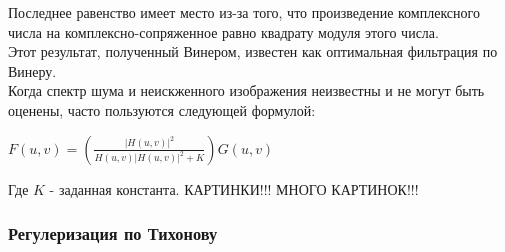 \documentclass{article}
\begin{document}
	Последнее равенство имеет место из-за того, что произведение комплексного числа на комплексно-сопряженное равно квадрату модуля этого числа.\\
	Этот результат, полученный Винером, известен как оптимальная фильтрация по Винеру.\\
	Когда спектр шума и неискженного изображения неизвестны и не могут быть оценены, часто пользуются следующей формулой:\\
		\begin{center}
		$F(u, v)=\left( \frac{\left| H(u, v) \right|^2}{H(u, v) \left| H(u, v)\right|^2 +K} \right) G(u,v)$
	\end{center}
	Где $K$ - заданная константа.
	КАРТИНКИ!!! МНОГО КАРТИНОК!!!
	\subsubsection{Регулеризация по Тихонову}
	
\end{document}

